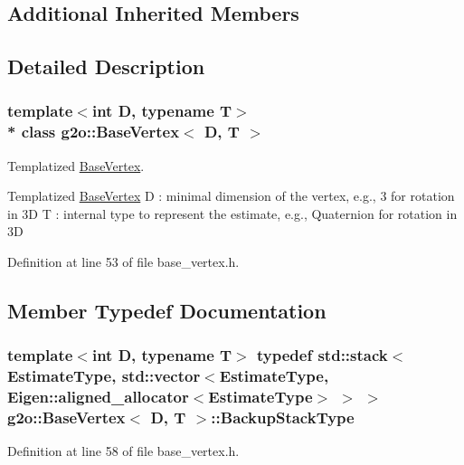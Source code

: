 \subsection*{Additional Inherited Members}


\subsection{Detailed Description}
\subsubsection*{template$<$int D, typename T$>$\\*
class g2o\+::\+Base\+Vertex$<$ D, T $>$}

Templatized \hyperlink{classg2o_1_1BaseVertex}{Base\+Vertex}. 

Templatized \hyperlink{classg2o_1_1BaseVertex}{Base\+Vertex} D \+: minimal dimension of the vertex, e.\+g., 3 for rotation in 3D T \+: internal type to represent the estimate, e.\+g., Quaternion for rotation in 3D 

Definition at line 53 of file base\+\_\+vertex.\+h.



\subsection{Member Typedef Documentation}
\subsubsection[{\texorpdfstring{Backup\+Stack\+Type}{BackupStackType}}]{\setlength{\rightskip}{0pt plus 5cm}template$<$int D, typename T$>$ typedef std\+::stack$<${\bf Estimate\+Type}, std\+::vector$<${\bf Estimate\+Type}, Eigen\+::aligned\+\_\+allocator$<${\bf Estimate\+Type}$>$ $>$ $>$ {\bf g2o\+::\+Base\+Vertex}$<$ D, T $>$\+::{\bf Backup\+Stack\+Type}}\hypertarget{classg2o_1_1BaseVertex_ae6632291d46b458196bdb021a6c8cba1}{}\label{classg2o_1_1BaseVertex_ae6632291d46b458196bdb021a6c8cba1}


Definition at line 58 of file base\+\_\+vertex.\+h.

